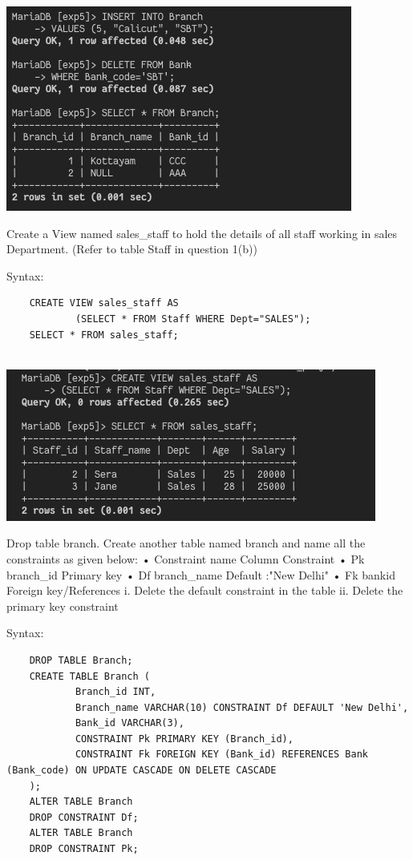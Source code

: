 \documentclass[13pt,oneside]{book}
\begin{document}
\begin{Itemize}
	\includegraphics[]{img/p5/ss1.6.png} \\
	
	
	\item
	Create a View named sales\_staff to hold the details of all staff working in sales 
			Department. (Refer to table Staff in question 1(b)) 
	 
	Syntax:
	\begin{verbatim}
	CREATE VIEW sales_staff AS 
			(SELECT * FROM Staff WHERE Dept="SALES");
	SELECT * FROM sales_staff;
	
	\end{verbatim}
	\includegraphics[]{img/p5/ss2.png}
	
	
	\item
	Drop table branch. Create another table named branch and name all the constraints as 
			given below: 
			• Constraint name Column Constraint 
			• Pk branch\_id Primary key 
			• Df branch\_name Default :"New Delhi" 
			• Fk bankid Foreign key/References 
			i. Delete the default constraint in the table ii. Delete the primary key constraint 
	 
	Syntax:
	\begin{verbatim}
	DROP TABLE Branch;
	CREATE TABLE Branch (
			Branch_id INT,
			Branch_name VARCHAR(10) CONSTRAINT Df DEFAULT 'New Delhi',
			Bank_id VARCHAR(3),
			CONSTRAINT Pk PRIMARY KEY (Branch_id),
			CONSTRAINT Fk FOREIGN KEY (Bank_id) REFERENCES Bank (Bank_code) ON UPDATE CASCADE ON DELETE CASCADE
	);
	ALTER TABLE Branch 
	DROP CONSTRAINT Df;
	ALTER TABLE Branch
	DROP CONSTRAINT Pk;
	

\end{verbatim}
\end{Itemize}
\end{document}
